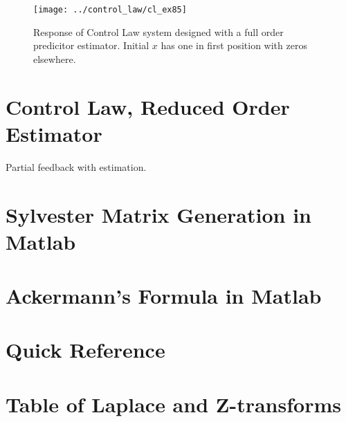 \documentclass{article}
\begin{document}


\begin{figure}[h!]
\begin{center}
\texttt{[image: ../control\_law/cl\_ex85]}
\end{center}
\caption{Response of Control Law system designed with a full
	order predicitor estimator.  Initial $x$ has one in
	first position with zeros elsewhere.}
\label{fig:cl_ex85}
\end{figure}


\clearpage
\section{Control Law, Reduced Order Estimator}

Partial feedback with estimation.

\clearpage
\printbibliography[heading=bibintoc]

\clearpage
\appendix

\section{Sylvester Matrix Generation in Matlab}
\label{app:sylvester}



\section{Ackermann's Formula in Matlab}
\label{app:myacker}



\section{Quick Reference}

\section{Table of Laplace and Z-transforms}
\end{document}
